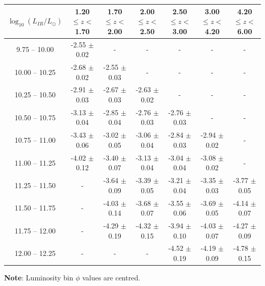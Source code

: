 \begin{landscape}
\begin{table}
\begin{center}
\begin{tabular}{@{}ccccccc@{}}
        \hline
        $\log_{10}(L_{IR}/L_{\odot})$ & 1.20 $\leq z <$ 1.70 & 1.70 $\leq z <$ 2.00 & 2.00 $\leq z <$ 2.50 & 2.50 $\leq z <$ 3.00 & 3.00 $\leq z <$ 4.20 & 4.20 $\leq z <$ 6.00  \\
        \hline
         9.75 -- 10.00 & -2.55 $\pm$ 0.02 & -                & -                & -                & -                & - \\
        10.00 -- 10.25 & -2.68 $\pm$ 0.02 & -2.55 $\pm$ 0.03 & -                & -                & -                & - \\
        10.25 -- 10.50 & -2.91 $\pm$ 0.03 & -2.67 $\pm$ 0.03 & -2.63 $\pm$ 0.02 & -                & -                & - \\
        10.50 -- 10.75 & -3.13 $\pm$ 0.04 & -2.85 $\pm$ 0.04 & -2.76 $\pm$ 0.03 & -2.76 $\pm$ 0.03 & -                & - \\
        10.75 -- 11.00 & -3.43 $\pm$ 0.06 & -3.02 $\pm$ 0.05 & -3.06 $\pm$ 0.04 & -2.84 $\pm$ 0.03 & -2.94 $\pm$ 0.02 & - \\
        11.00 -- 11.25 & -4.02 $\pm$ 0.12 & -3.40 $\pm$ 0.07 & -3.13 $\pm$ 0.04 & -3.04 $\pm$ 0.04 & -3.08 $\pm$ 0.02 & - \\
        11.25 -- 11.50 & -                & -3.64 $\pm$ 0.09 & -3.39 $\pm$ 0.05 & -3.21 $\pm$ 0.04 & -3.35 $\pm$ 0.03 & -3.77 $\pm$ 0.05 \\
        11.50 -- 11.75 & -                & -4.03 $\pm$ 0.14 & -3.68 $\pm$ 0.07 & -3.55 $\pm$ 0.06 & -3.69 $\pm$ 0.05 & -4.14 $\pm$ 0.07 \\
        11.75 -- 12.00 & -                & -4.29 $\pm$ 0.19 & -4.32 $\pm$ 0.15 & -3.94 $\pm$ 0.10 & -4.03 $\pm$ 0.07 & -4.27 $\pm$ 0.09 \\
        12.00 -- 12.25 & -                & -                & -                & -4.52 $\pm$ 0.19 & -4.19 $\pm$ 0.09 & -4.78 $\pm$ 0.15 \\
        \bottomrule
    \end{tabular}
    \end{center}
    \textbf{Note}: Luminosity bin $\phi$ values are centred.
    \end{table}
\end{landscape}

